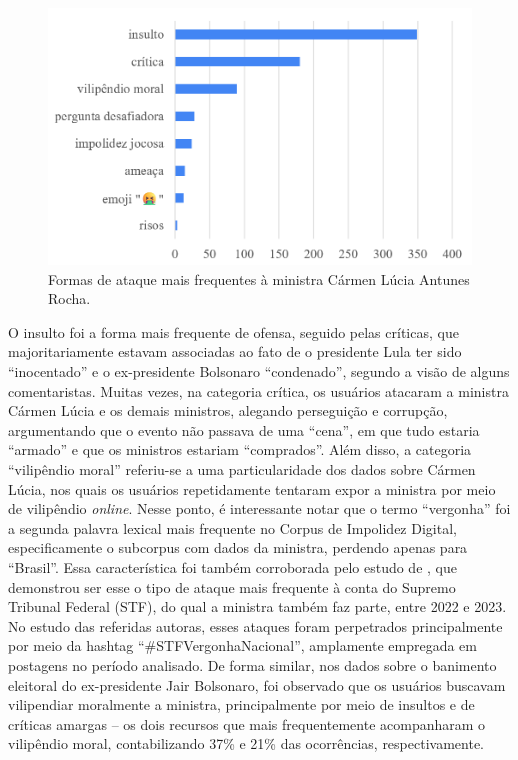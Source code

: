 \documentclass[portuguese]{textolivre}
\begin{document}
\begin{figure}[h!]
\centering
\begin{minipage}{.70\textwidth}
\includegraphics[width =\textwidth]{Fig7.png}
\caption{Formas de ataque mais frequentes à ministra Cármen Lúcia Antunes Rocha.}
\label{graf-5}
\end{minipage}
\end{figure}

O insulto foi a forma mais frequente de ofensa, seguido pelas críticas, que majoritariamente estavam associadas ao fato de o presidente Lula ter sido ``inocentado'' e o ex-presidente Bolsonaro ``condenado'', segundo a visão de alguns comentaristas. Muitas vezes, na categoria crítica, os usuários atacaram a ministra Cármen Lúcia e os demais ministros, alegando perseguição e corrupção, argumentando que o evento não passava de uma ``cena'', em que tudo estaria ``armado'' e que os ministros estariam ``comprados''. Além disso, a categoria ``vilipêndio moral'' referiu-se a uma particularidade dos dados sobre Cármen Lúcia, nos quais os usuários repetidamente tentaram expor a ministra por meio de vilipêndio \textit{online}. Nesse ponto, é interessante notar que o termo ``vergonha'' foi a segunda palavra lexical mais frequente no Corpus de Impolidez Digital, especificamente o subcorpus com dados da ministra, perdendo apenas para ``Brasil''. Essa característica foi também corroborada pelo estudo de \textcite{oliveira2024}, que demonstrou ser esse o tipo de ataque mais frequente à conta do Supremo Tribunal Federal (STF), do qual a ministra também faz parte, entre 2022 e 2023. No estudo das referidas autoras, esses ataques foram perpetrados principalmente por meio da hashtag ``\#STFVergonhaNacional'', amplamente empregada em postagens no período analisado. De forma similar, nos dados sobre o banimento eleitoral do ex-presidente Jair Bolsonaro, foi observado que os usuários buscavam vilipendiar moralmente a ministra, principalmente por meio de insultos e de críticas amargas – os dois recursos que mais frequentemente acompanharam o vilipêndio moral, contabilizando 37\% e 21\% das ocorrências, respectivamente.
\end{document}
